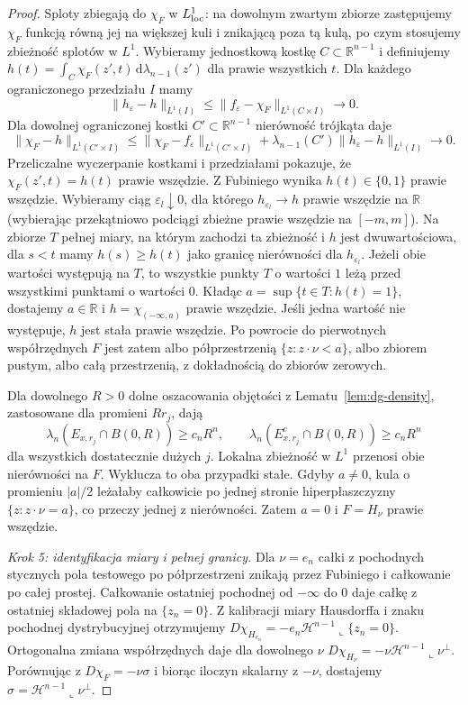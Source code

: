 \begin{proof}
Sploty zbiegają do $\chi_F$ w $L^1_{\rm loc}$:
na dowolnym zwartym zbiorze zastępujemy $\chi_F$
funkcją równą jej na większej kuli i znikającą poza
tą kulą, po czym stosujemy zbieżność splotów w $L^1$.
Wybieramy jednostkową kostkę $C\subset\mathbb R^{n-1}$
i definiujemy $h(t)=\int_C\chi_F(z',t)\,
\mathrm d\lambda_{n-1}(z')$ dla prawie wszystkich $t$.
Dla każdego ograniczonego przedziału $I$ mamy
\[
 \|h_\varepsilon-h\|_{L^1(I)}
 \le\|f_\varepsilon-\chi_F\|_{L^1(C\times I)}
 \longrightarrow0.
\]
Dla dowolnej ograniczonej kostki $C'\subset\mathbb R^{n-1}$
nierówność trójkąta daje
\[
 \|\chi_F-h\|_{L^1(C'\times I)}
 \le\|\chi_F-f_\varepsilon\|_{L^1(C'\times I)}
 +\lambda_{n-1}(C')\|h_\varepsilon-h\|_{L^1(I)}
 \longrightarrow0.
\]
Przeliczalne wyczerpanie kostkami i przedziałami
pokazuje, że $\chi_F(z',t)=h(t)$ prawie wszędzie.
Z Fubiniego wynika $h(t)\in\{0,1\}$ prawie wszędzie.
Wybieramy ciąg $\varepsilon_l\downarrow0$,
dla którego $h_{\varepsilon_l}\to h$ prawie wszędzie
na $\mathbb R$ (wybierając przekątniowo
podciągi zbieżne prawie wszędzie na $[-m,m]$).
Na zbiorze $T$ pełnej miary, na którym zachodzi
ta zbieżność i $h$ jest dwuwartościowa, dla $s<t$
mamy $h(s)\ge h(t)$ jako granicę nierówności
dla $h_{\varepsilon_l}$. Jeżeli obie wartości
występują na $T$, to wszystkie punkty $T$ o wartości
$1$ leżą przed wszystkimi punktami o wartości $0$.
Kładąc $a=\sup\{t\in T:h(t)=1\}$, dostajemy
$a\in\mathbb R$ i $h=\chi_{(-\infty,a)}$
prawie wszędzie. Jeśli jedna wartość nie występuje,
$h$ jest stała prawie wszędzie.
Po powrocie do pierwotnych współrzędnych $F$
jest zatem albo półprzestrzenią $\{z:z\cdot\nu<a\}$,
albo zbiorem pustym, albo całą przestrzenią,
z dokładnością do zbiorów zerowych.

Dla dowolnego $R>0$ dolne oszacowania objętości
z Lematu~\ref{lem:dg-density}, zastosowane
dla promieni $Rr_j$, dają
\[
 \lambda_n(E_{x,r_j}\cap B(0,R))\ge c_nR^n,
 \qquad
 \lambda_n(E_{x,r_j}^c\cap B(0,R))\ge c_nR^n
\]
dla wszystkich dostatecznie dużych $j$.
Lokalna zbieżność w $L^1$ przenosi obie nierówności
na $F$. Wyklucza to oba przypadki stałe.
Gdyby $a\ne0$, kula o promieniu $|a|/2$
leżałaby całkowicie po jednej stronie hiperpłaszczyzny
$\{z:z\cdot\nu=a\}$, co przeczy jednej z nierówności.
Zatem $a=0$ i $F=H_\nu$ prawie wszędzie.

\emph{Krok 5: identyfikacja miary i pełnej granicy.}
Dla $\nu=e_n$ całki z pochodnych stycznych
pola testowego po półprzestrzeni znikają przez
Fubiniego i całkowanie po całej prostej.
Całkowanie ostatniej pochodnej od $-\infty$
do $0$ daje całkę z ostatniej składowej pola
na $\{z_n=0\}$. Z kalibracji miary Hausdorffa
i znaku pochodnej dystrybucyjnej otrzymujemy
$D\chi_{H_{e_n}}=-e_n\mathcal H^{n-1}
\llcorner\{z_n=0\}$. Ortogonalna zmiana współrzędnych
daje dla dowolnego $\nu$
$D\chi_{H_\nu}=-\nu\mathcal H^{n-1}\llcorner\nu^\perp$.
Porównując z $D\chi_F=-\nu\sigma$ i biorąc
iloczyn skalarny z $-\nu$, dostajemy
$\sigma=\mathcal H^{n-1}\llcorner\nu^\perp$.


\end{proof}
